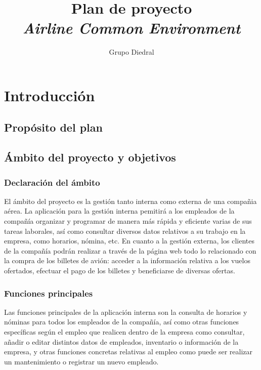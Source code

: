 \documentclass[11pt, a4paper, twoside]{report}
\title{Plan de proyecto\\\textsl{Airline Common Environment}}
\author{Grupo Diedral}
\begin{document}
	
	\tableofcontents
	\newpage

	\begin{scriptsize}
	\begin{tablacambios}
	\end{tablacambios}
	\end{scriptsize}
	\newpage

	\section{Introducción}
	\iniciarnumeraciondiedral
		\subsection{Propósito del plan}
		\subsection{Ámbito del proyecto y objetivos}
			\subsubsection{Declaración del ámbito}
			El ámbito del proyecto es la gestión tanto interna como externa de una compañia aérea. La aplicación para la gestión interna pemitirá a los empleados de la compañía organizar y programar de manera más rápida y eficiente varias de sus tareas laborales, así como consultar diversos datos relativos a su trabajo en la empresa, como horarios, nómina, etc. En cuanto a la gestión externa, los clientes de la compañía podrán realizar a través de la página web todo lo relacionado con la compra de los billetes de avión: acceder a la información relativa a los vuelos ofertados, efectuar el pago de los billetes y beneficiarse de diversas ofertas.

			\subsubsection{Funciones principales}
			Las funciones principales de la aplicación interna son la consulta de horarios y nóminas para todos los empleados de la compañía, así como otras funciones específicas según el empleo que realicen dentro de la empresa como consultar, añadir o editar distintos datos de empleados, inventario o información de la empresa, y otras funciones concretas relativas al empleo como puede ser realizar un mantenimiento o registrar un nuevo empleado. \\
\end{document}
